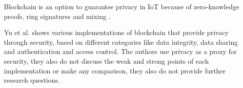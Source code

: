 \documentclass[conference]{IEEEtran}
\begin{document}
Blockchain is an option to guarantee privacy in IoT because of zero-knowledge
proofs, ring signatures and mixing \cite{PrivacyblockchainWikipedia}.




Yu et al. \cite{yu2018blockchain} shows various implementations of blockchain
that provide privacy through security, based on different categories like
data integrity, data sharing and authentication and access control. The authors
use privacy as a proxy for security, they also do not discuss the weak and
strong points of each implementation or make any comparison, they also do not
provide further research questions.
\end{document}
